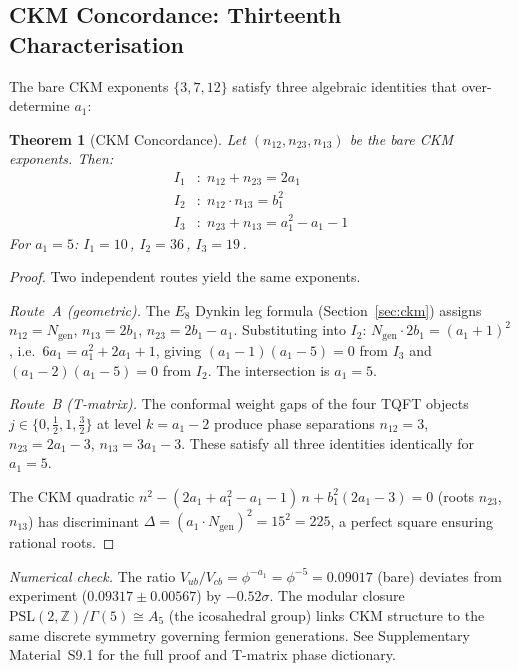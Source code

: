 \documentclass[12pt,a4paper]{article}
\newtheorem{theorem}{Theorem}
\theoremstyle{definition}
\begin{document}
\subsection{CKM Concordance: Thirteenth Characterisation}
\label{sec:ckm_concordance}

The bare CKM exponents $\{3, 7, 12\}$ satisfy three algebraic identities that over-determine $a_1$:

\begin{theorem}[CKM Concordance]
\label{thm:ckm_concordance}
Let $(n_{12}, n_{23}, n_{13})$ be the bare CKM exponents.  Then:
\begin{align}
I_1&\colon\; n_{12} + n_{23} = 2a_1 \label{eq:I1}\\
I_2&\colon\; n_{12} \cdot n_{13} = b_1^2 \label{eq:I2}\\
I_3&\colon\; n_{23} + n_{13} = a_1^2 - a_1 - 1 \label{eq:I3}
\end{align}
For $a_1 = 5$: $I_1 = 10$\,\checkmark, $I_2 = 36$\,\checkmark, $I_3 = 19$\,\checkmark.
\end{theorem}

\begin{proof}
Two independent routes yield the same exponents.

\emph{Route~A (geometric).}  The $E_8$ Dynkin leg formula (Section~\ref{sec:ckm}) assigns $n_{12} = N_{\text{gen}}$, $n_{13} = 2b_1$, $n_{23} = 2b_1 - a_1$.  Substituting into $I_2$: $N_{\text{gen}} \cdot 2b_1 = (a_1+1)^2$, i.e.\ $6a_1 = a_1^2 + 2a_1 + 1$, giving $(a_1 - 1)(a_1 - 5) = 0$ from $I_3$ and $(a_1 - 2)(a_1 - 5) = 0$ from $I_2$.  The intersection is $a_1 = 5$.

\emph{Route~B (T-matrix).}  The conformal weight gaps of the four TQFT objects $j \in \{0, \tfrac{1}{2}, 1, \tfrac{3}{2}\}$ at level $k = a_1 - 2$ produce phase separations $n_{12} = 3$, $n_{23} = 2a_1 - 3$, $n_{13} = 3a_1 - 3$.  These satisfy all three identities identically for $a_1 = 5$.

The CKM quadratic $n^2 - (2a_1 + a_1^2 - a_1 - 1)\,n + b_1^2(2a_1 - 3) = 0$ (roots $n_{23}$, $n_{13}$) has discriminant $\Delta = (a_1 \cdot N_{\text{gen}})^2 = 15^2 = 225$, a perfect square ensuring rational roots.
\end{proof}

\noindent\textit{Numerical check.}  The ratio $V_{ub}/V_{cb} = \phi^{-a_1} = \phi^{-5} = 0.09017$ (bare) deviates from experiment ($0.09317 \pm 0.00567$) by $-0.52\sigma$.  The modular closure $\text{PSL}(2,\mathbb{Z})/\Gamma(5) \cong A_5$ (the icosahedral group) links CKM structure to the same discrete symmetry governing fermion generations.  See Supplementary Material~S9.1 for the full proof and T-matrix phase dictionary.
\end{document}
